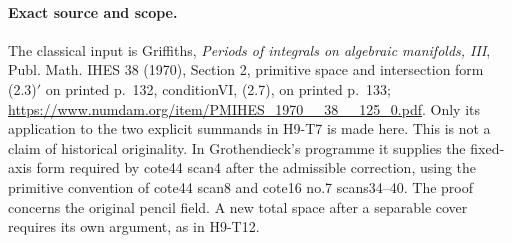 \paragraph{Exact source and scope.}
The classical input is Griffiths, \emph{Periods of integrals on
algebraic manifolds, III}, Publ. Math. IHES 38 (1970), Section 2,
primitive space and intersection form (2.3)$'$ on printed p.~132,
conditionVI, (2.7), on printed p.~133;
\url{https://www.numdam.org/item/PMIHES_1970__38__125_0.pdf}.
Only its application to the two explicit summands in H9-T7 is
made here. This is not a claim of historical originality. In
Grothendieck's programme it supplies the fixed-axis form required
by cote44 scan4 after the admissible correction, using the
primitive convention of cote44 scan8 and cote16 no.7 scans34--40.
The proof concerns the original pencil field. A new total space
after a separable cover requires its own argument, as in H9-T12.
